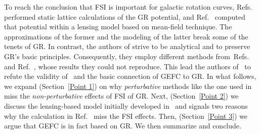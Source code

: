 \documentclass[superscriptaddress,amsmath,amssymb,nofootinbib]{revtex4}
\begin{document}
To reach the conclusion that FSI is important for galactic rotation curves, Refs.~\cite{Deur:2009ya, Deur:2016bwq} performed static lattice calculations of the GR potential, and Ref.~\cite{Deur:2020wlg} computed that potential 
within  a lensing model based on mean-field technique. The approximations of the former and the modeling of the latter break some of the
tenets of GR. In contrast, the authors of \cite{Barker:2023xsx} strive to be analytical and to preserve GR's basic principles. Consequently, they employ different methods 
from~Refs.~\cite{Deur:2009ya, Deur:2016bwq} and Ref.~\cite{Deur:2020wlg}, whose results they could not reproduce. 
%
This lead the authors of~\cite{Barker:2023xsx} to refute the validity of~\cite{Deur:2009ya, Deur:2016bwq, Deur:2017aas, Deur:2019kqi, Deur:2020wlg, Deur:2021ink, 
Deur:2022ooc, Sargent:2023djq} and the basic connection of GEFC to GR. 
%
In what follows, we expand (Section~\ref{Point 1}) on why {\it perturbative} methods like the one used in~\cite{Barker:2023xsx} miss the {\it non-perturbative}  effects of FSI of GR. %
%
Next, (Section~\ref{Point 2}) we discuss the lensing-based model initially developed in~\cite{Deur:2020wlg} and signals two reasons 
why the calculation  in Ref.~\cite{Barker:2023xsx} miss the FSI effects.  
%
Then, (Section~\ref{Point 3}) we argue that GEFC is in fact based on GR.  
%
We then summarize and conclude.
\end{document}
